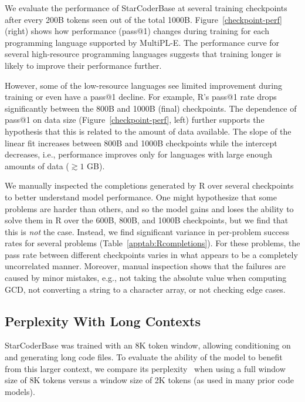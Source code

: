 \documentclass[10pt]{article} %
\begin{document}
We evaluate the performance of StarCoderBase at several training checkpoints after every 200B tokens seen out of the total 1000B. Figure~\ref{checkpoint-perf} (right) shows how performance (pass@1) changes during training for each programming language supported by MultiPL-E. The performance curve for several high-resource programming languages suggests that training longer is likely to improve their performance further. 

However, some of the low-resource languages see limited improvement during training or even have a pass@1 decline. For example, R's pass@1 rate drops significantly between the 800B and 1000B (final) checkpoints. The dependence of pass@1 on data size (Figure~\ref{checkpoint-perf}, left) further supports the hypothesis that this is related to the amount of data available. The slope of the linear fit increases between 800B and 1000B checkpoints while the intercept decreases, i.e.,  performance improves only for languages with large enough amounts of data ($\gtrsim 1$ GB).

We manually inspected the completions generated by R over several checkpoints to better understand model performance. One might hypothesize that some problems are harder than others, and so the model gains and loses the ability to solve them in R over the 600B, 800B, and 1000B checkpoints, but we find that this is \emph{not} the case. Instead, we find significant variance in per-problem success rates for several problems (Table~\ref{apptab:Rcompletions}).
For these problems, the pass rate between different checkpoints varies in what appears to be a completely uncorrelated manner. Moreover, manual inspection shows that the failures are caused by minor mistakes,  e.g., not taking the absolute value when computing GCD, not converting a string to a character array, or not checking edge cases. 

\subsection{Perplexity With Long Contexts}

StarCoderBase was trained with an 8K token window, allowing conditioning on and generating long code files. To evaluate the ability of the model to benefit from this larger context, we compare its perplexity~\citep{bahl1983perplexity} when using a full window size of 8K tokens versus a window size of 2K tokens (as used in many prior code models).
\end{document}

